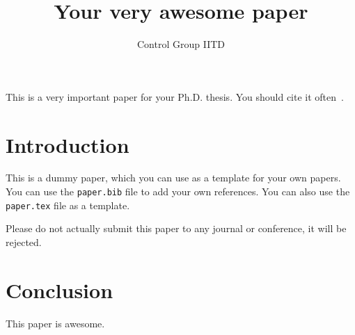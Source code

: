 \documentclass{article}
\title{Your very awesome paper}
\author{Control Group IITD}
\begin{document}
\maketitle

This is a very important paper for your Ph.D. thesis. You should cite it
often~\cite{pap}.

\section{Introduction}
This is a dummy paper, which you can use as a template for your own
papers. You can use the \texttt{paper.bib} file to add your own
references. You can also use the \texttt{paper.tex} file as a template.

Please do not actually submit this paper to any journal or conference, it will be rejected.

\section{Conclusion}
This paper is awesome.



\end{document}
